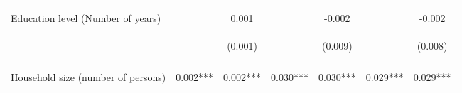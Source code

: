 \begin{center}
\begin{tabular}{lcccccc}
\vspace{4pt} & \begin{footnotesize}\end{footnotesize} & \begin{footnotesize}[0.465]\end{footnotesize} & \begin{footnotesize}\end{footnotesize} & \begin{footnotesize}[0.643]\end{footnotesize} & \begin{footnotesize}\end{footnotesize} & \begin{footnotesize}[0.566]\end{footnotesize} \\
Education level (Number of years) &  & 0.001 &  & -0.002 &  & -0.002 \\
 & \begin{footnotesize}\end{footnotesize} & \begin{footnotesize}(0.001)\end{footnotesize} & \begin{footnotesize}\end{footnotesize} & \begin{footnotesize}(0.009)\end{footnotesize} & \begin{footnotesize}\end{footnotesize} & \begin{footnotesize}(0.008)\end{footnotesize} \\
\vspace{4pt} & \begin{footnotesize}\end{footnotesize} & \begin{footnotesize}[0.454]\end{footnotesize} & \begin{footnotesize}\end{footnotesize} & \begin{footnotesize}[0.865]\end{footnotesize} & \begin{footnotesize}\end{footnotesize} & \begin{footnotesize}[0.800]\end{footnotesize} \\
Household size (number of persons) & 0.002*** & 0.002*** & 0.030*** & 0.030*** & 0.029*** & 0.029*** \\

\end{tabular}
\end{center}
